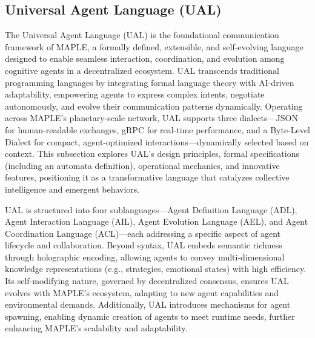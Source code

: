 \documentclass[a4paper,11pt]{article}
\begin{document}
\subsection{Universal Agent Language (UAL)}
The Universal Agent Language (UAL) is the foundational communication framework of MAPLE, a formally defined, extensible, and self-evolving language designed to enable seamless interaction, coordination, and evolution among cognitive agents in a decentralized ecosystem. UAL transcends traditional programming languages by integrating formal language theory with AI-driven adaptability, empowering agents to express complex intents, negotiate autonomously, and evolve their communication patterns dynamically. Operating across MAPLE’s planetary-scale network, UAL supports three dialects—JSON for human-readable exchanges, gRPC for real-time performance, and a Byte-Level Dialect for compact, agent-opti\-mized inter\-actions—dynamically selected based on context. This subsection explores UAL’s design principles, formal specifications (including an automata definition), operational mechanics, and innovative features, positioning it as a transformative language that catalyzes collective intelligence and emergent behaviors.

UAL is structured into four sublanguages—Agent Definition Language (ADL), Agent Interaction Language (AIL), Agent Evolution Language (AEL), and Agent Coordination Language (ACL)—each addressing a specific aspect of agent lifecycle and collaboration. Beyond syntax, UAL embeds semantic richness through holographic encoding, allowing agents to convey multi-dimensional knowledge representations (e.g., strategies, emotional states) with high efficiency. Its self-modifying nature, governed by decentralized consensus, ensures UAL evolves with MAPLE’s ecosystem, adapting to new agent capabilities and environmental demands. Additionally, UAL introduces mechanisms for agent spawning, enabling dynamic creation of agents to meet runtime needs, further enhancing MAPLE’s scalability and adaptability.
\end{document}
